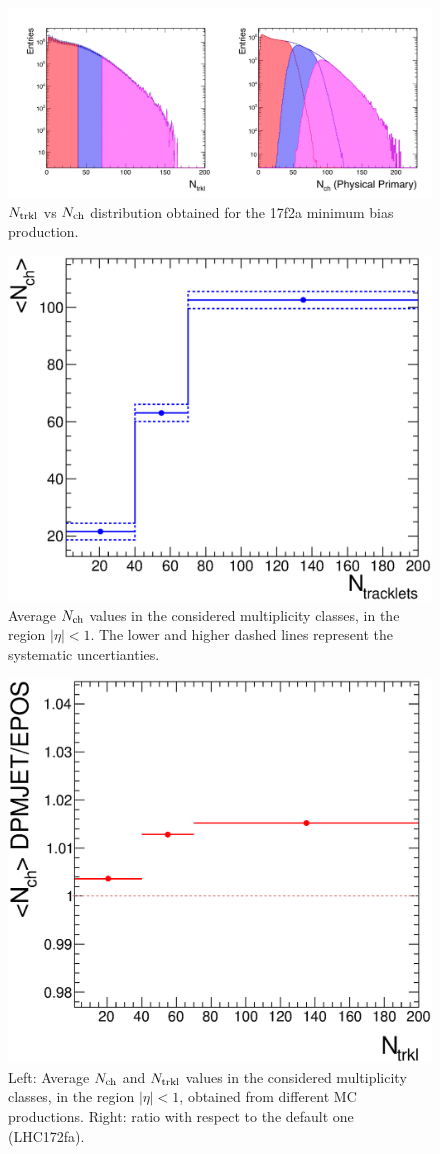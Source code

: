 \begin{figure}[h]
\centering
 \includegraphics[width=1.\textwidth]{FigCap6/NtrklNchDistrWithNtrklsReweight_17f2a.png}
 \caption{$N_{\rm trkl}$ vs $N_{\rm ch}$ distribution obtained for the 17f2a minimum bias production.}
 \label{fig:NtrklVsNch}
\end{figure}

\begin{figure}[h]
\centering
 \includegraphics[width=.55\textwidth]{FigCap6/AverNchAndTotalSystUnc.eps}
 \caption{Average $N_{\rm ch}$ values in the considered multiplicity classes, in the region $|\eta |< 1$. The lower and higher dashed lines represent the systematic uncertianties.}
 \label{fig:Nch}
\end{figure}

\begin{figure}[htpb]
\centering
 \includegraphics[width=.49\textwidth]{FigCap6/comparisonNtrkl_17f2b_17d2a_17f2a_onlySyst.eps}
 \caption{Left: Average $N_{\rm ch}$ and $N_{\rm trkl}$ values in the considered multiplicity classes, in the region $|\eta |< 1$, obtained from different MC productions. Right: ratio with respect to the default one (LHC172fa).}
 \label{fig:NchVsMCgenerator}
 \end{figure}


